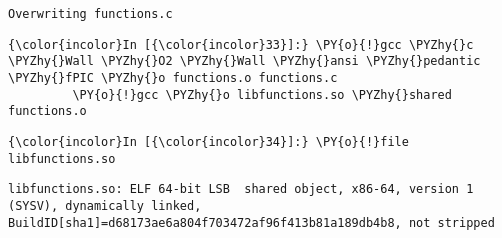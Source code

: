     \begin{Verbatim}[commandchars=\\\{\}]
Overwriting functions.c

    \end{Verbatim}



    \begin{Verbatim}[commandchars=\\\{\}]
{\color{incolor}In [{\color{incolor}33}]:} \PY{o}{!}gcc \PYZhy{}c \PYZhy{}Wall \PYZhy{}O2 \PYZhy{}Wall \PYZhy{}ansi \PYZhy{}pedantic \PYZhy{}fPIC \PYZhy{}o functions.o functions.c
         \PY{o}{!}gcc \PYZhy{}o libfunctions.so \PYZhy{}shared functions.o
\end{Verbatim}



    \begin{Verbatim}[commandchars=\\\{\}]
{\color{incolor}In [{\color{incolor}34}]:} \PY{o}{!}file libfunctions.so
\end{Verbatim}

    \begin{Verbatim}[commandchars=\\\{\}]
libfunctions.so: ELF 64-bit LSB  shared object, x86-64, version 1 (SYSV), dynamically linked, BuildID[sha1]=d68173ae6a804f703472af96f413b81a189db4b8, not stripped


    \end{Verbatim}




